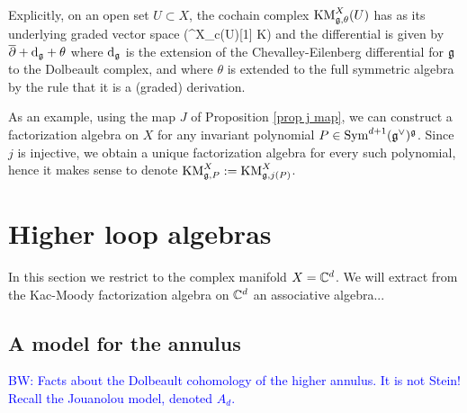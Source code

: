 \documentclass[10pt]{amsart}
\def\brian{\textcolor{blue}{BW: }\textcolor{blue}}
\begin{document}
Explicitly, on an open set $U \subset X$, the cochain complex ${\rm KM}^X_{\mathfrak g,\theta}(U)$ has as its underlying graded vector space
\ben
\Sym\left(\fg^X_{c}(U)[1] \oplus \CC \cdot K\right)
\een
and the differential is given by $\dbar + \d_\fg + \theta$ where ${\rm d}_\mathfrak g$ is the extension of the Chevalley-Eilenberg differential for $\mathfrak g$ to the Dolbeault complex, and where $\theta$ is extended to the full symmetric algebra by the rule that it is a (graded) derivation. 

\begin{eg} As an example, using the map $J$ of Proposition \ref{prop j map}, we can construct a factorization algebra on $X$ for any invariant polynomial $P \in {\rm Sym}^{d+1}(\mathfrak g^\vee)^\mathfrak g$. Since $j$ is injective, we obtain a unique factorization algebra for every such polynomial, hence it makes sense to denote ${\rm KM}^X_{\mathfrak g, P} := {\rm KM}^X_{\mathfrak g,j(P)}$. 
\end{eg}

\section{Higher loop algebras}
\def\PD{{\rm PD}}
\def\Bar{\overline}

In this section we restrict to the complex manifold $X = \mathbb C^d$. We will extract from the Kac-Moody factorization algebra on $\mathbb C^d$ an associative algebra...

\subsection{A model for the annulus}

\brian{Facts about the Dolbeault cohomology of the higher annulus. It is not Stein! Recall the Jouanolou model, denoted $A_d$.}
%
%
%
\end{document}
